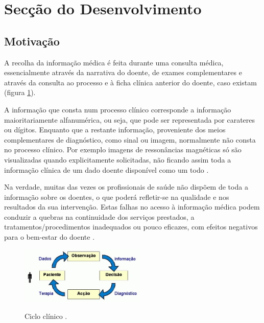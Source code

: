 \documentclass[conference]{IEEEtran}
\begin{document}
\section{Secção do Desenvolvimento}

\subsection{Motivação}

A recolha da informação médica é feita durante uma consulta médica, essencialmente através da narrativa do doente, de exames complementares e através da consulta ao processo e à ficha clínica anterior do doente, caso existam (figura \ref{fig1}).

A informação que consta num processo clínico corresponde a informação maioritariamente alfanumérica, ou seja, que pode ser representada por carateres ou dígitos. Enquanto que a restante informação, proveniente dos meios complementares de diagnóstico, como sinal ou imagem, normalmente não consta no processo clínico. Por exemplo imagens de ressonâncias magnéticas só são visualizadas quando explicitamente solicitadas, não ficando assim toda a informação clínica de um dado doente disponível como um todo \cite{santos2010comunicaccao}.

Na verdade, muitas das vezes os profissionais de saúde não dispõem de toda a informação sobre os doentes, o que poderá refletir-se na qualidade e nos resultados da sua intervenção. Estas falhas no acesso à informação médica podem conduzir a quebras na continuidade dos serviços prestados, a tratamentos/procedimentos inadequados ou pouco eficazes, com efeitos negativos para o bem-estar do doente \cite{santos2010comunicaccao}. 

\begin{figure}[!t]	
    \centering
    \begin{minipage}{.9\textwidth}
        \includegraphics[width=0.53\textwidth]{diagnostico_terapeutica.png}
        \label{fig1}
    \end{minipage}%
    \caption{Ciclo clínico \cite{regclinelect}.}
\end{figure}
 
\end{document}
